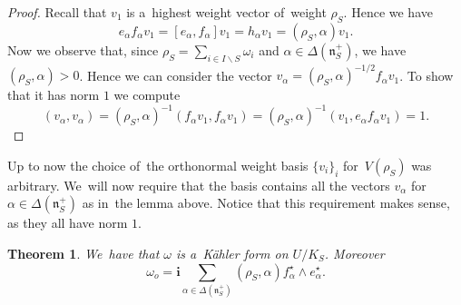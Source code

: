 \documentclass[pdftex]{sigma}
\numberwithin{equation}{section}
\newtheorem{Theorem}{Theorem}[section]
\newcommand{\lien}{\mathfrak{n}}
\newcommand{\iu}{\boldsymbol{i}}
\newcommand{\kafo}{\omega}
\newcommand{\homroot}{\Delta(\lien_S^+)}
\begin{document}
\begin{proof}
Recall that $v_1$ is a~highest weight vector of~weight $\rho_S$. Hence we have
\[
e_\alpha f_\alpha v_1 = [e_\alpha, f_\alpha] v_1 = h_\alpha v_1 = (\rho_S, \alpha) v_1.
\]
Now we observe that, since $\rho_S = \sum_{i \in I \backslash S} \omega_i$ and $\alpha \in \homroot$, we have $(\rho_S, \alpha) > 0$.
Hence we can consider the vector $v_\alpha = (\rho_S, \alpha)^{-1/2} f_\alpha v_1$.
To show that it has norm $1$ we compute
\[
(v_\alpha, v_\alpha) = (\rho_S, \alpha)^{-1} (f_\alpha v_1, f_\alpha v_1)
= (\rho_S, \alpha)^{-1} (v_1, e_\alpha f_\alpha v_1) = 1. \tag*{\qed}
\]
\renewcommand{\qed}{}
\end{proof}

Up to now the choice of~the orthonormal weight basis $\{v_i\}_i$ for~$V(\rho_S)$ was arbitrary.
We~will now require that the basis contains all the vectors $v_\alpha$ for~$\alpha \in \homroot$ as in~the lemma above.
Notice that this requirement makes sense, as they all have norm $1$.

\begin{Theorem}
\label{thm:kahler-form}
We~have that $\kafo$ is a~K\"ahler form on $U / K_S$. Moreover
\[
\kafo_o = \iu \sum_{\alpha \in \homroot} (\rho_S, \alpha) f_\alpha^\star \wedge e_\alpha^\star.
\]
\end{Theorem}
\end{document}
